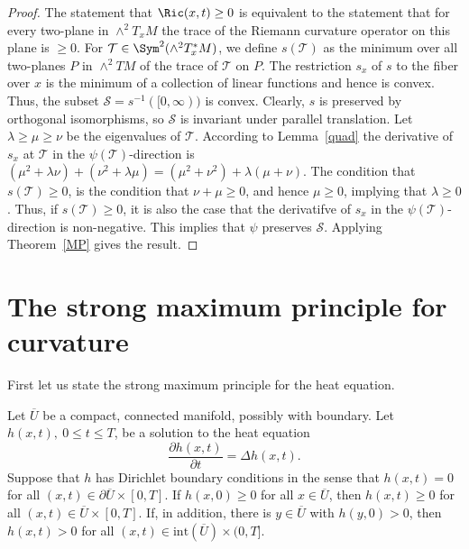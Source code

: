 \begin{proof}
The statement that $\Ric(x,t)\ge 0$ is equivalent to the statement that
for every two-plane in $\wedge^2 T_xM$ the trace of the Riemann curvature
operator on this plane is $\ge 0$. For ${\mathcal T}\in \Sym^2(\wedge^2T_x^*M)$, we define $s({\mathcal T})$ as the minimum over all
two-planes $P$ in $\wedge^2TM$ of the trace of ${\mathcal T}$ on $P$. The
restriction $s_x$ of $s$ to the fiber over $x$ is the minimum of a collection
of linear functions and hence is convex. Thus, the subset ${\mathcal
S}=s^{-1}([0,\infty))$ is convex. Clearly, $s$ is preserved by orthogonal
isomorphisms, so ${\mathcal S}$ is invariant under parallel translation. Let
$\lambda\ge\mu\ge\nu$ be the eigenvalues of ${\mathcal T}$. According to
Lemma~\ref{quad} the derivative of $s_x$ at ${\mathcal T}$ in the
$\psi({\mathcal T})$-direction is
$(\mu^2+\lambda\nu)+(\nu^2+\lambda\mu)=(\mu^2+\nu^2)+\lambda(\mu+\nu)$. The
condition that $s({\mathcal T})\ge 0$, is the condition that $\nu+\mu\ge 0$,
and hence $\mu\ge 0$, implying that $\lambda\ge 0$. Thus, if $s({\mathcal
T})\ge 0$, it is also the case that the derivatifve of $s_x$ in the
$\psi({\mathcal T})$-direction is non-negative. This implies that $\psi$
preserves ${\mathcal S}$. Applying Theorem~\ref{MP} gives the result.
\end{proof}


\section{The strong maximum principle for curvature}

First let us state the strong maximum principle for the heat
equation.%

\begin{theorem}
\label{thm:strong-maximum-principle-heat}\label{SMPheat}
Let $\overline U$ be a compact, connected manifold, possibly with boundary. Let
$h(x,t),\ 0\le t\le T$, be a solution to the heat equation
$$\frac{\partial h(x,t)}{\partial t}=\Delta h(x,t).$$
 Suppose that  $h$ has Dirichlet boundary conditions in the sense
that $h(x,t)=0$ for all $(x,t)\in\partial \overline U\times [0,T]$.
If $h(x,0)\ge 0$ for all $x\in \overline U$, then $h(x,t)\ge 0$ for
all $(x,t)\in \overline U\times [0,T]$. If, in addition, there is
$y\in \overline U$ with $h(y,0)>0$, then $h(x,t)>0$ for all
$(x,t)\in \mathrm{int}(\overline U)\times(0,T]$.
\end{theorem}

